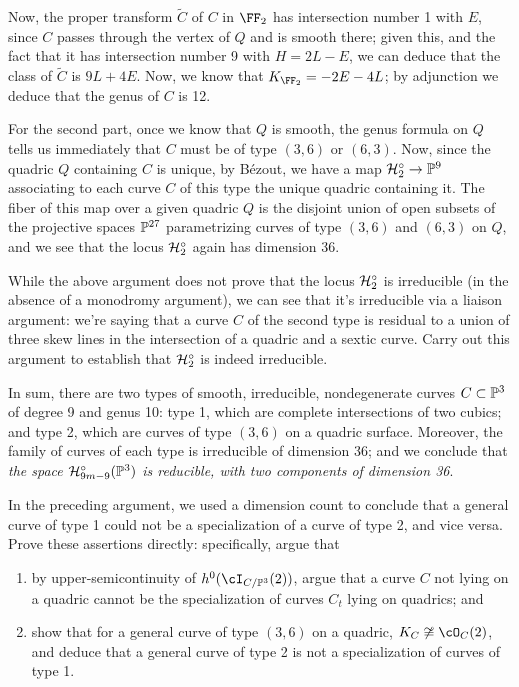 Now, the proper transform $\tilde C$ of $C$ in $\FF_2$ has intersection number 1 with $E$, since $C$ passes through the vertex of $Q$ and is smooth there; given this, and the fact that it has intersection number 9 with $H = 2L-E$, we can deduce that the class of $\tilde C$ is $9L + 4E$. Now, we know that $K_{\FF_2} = -2E - 4L$; by adjunction we deduce that  the genus of $C$ is 12.

For the second part, once we know that $Q$ is smooth, the genus formula on $Q$ tells us immediately that $C$ must be of type $(3,6)$ or $(6,3)$. Now, since the quadric $Q$ containing $C$ is unique, by B\'ezout, we have a map $\cH^\circ_2 \to \PP^9$ associating to each curve $C$ of this type the unique quadric containing it. The fiber of this map over a given quadric $Q$ is the disjoint union of open subsets of the projective spaces $\PP^{27}$ parametrizing curves of type $(3,6)$ and $(6,3)$ on $Q$, and we see that the locus $\cH^\circ_2$ again has dimension 36.

\begin{exercise}
While the above argument does not prove that the locus $\cH^\circ_2$ is irreducible (in the absence of a monodromy argument), we can see that it's irreducible via a liaison argument: we're saying that a curve $C$ of the second type is residual to a union of three skew lines in the intersection of a quadric and a sextic curve. Carry out this argument to establish that $\cH^\circ_2$ is indeed irreducible.
\end{exercise}


In sum, there are two types of smooth, irreducible, nondegenerate curves $C \subset \PP^3$ of degree 9 and genus 10: type 1, which are complete intersections of two cubics; and type 2, which are curves of type $(3,6)$ on a quadric surface. Moreover, the family of curves of each type is irreducible of dimension 36; and we conclude that \emph{the space $\cH^\circ_{9m-9}(\PP^3)$ is reducible, with two components of dimension 36}.


\begin{exercise}
In the preceding argument, we used a dimension count to conclude that a general curve of type 1 could not be a specialization of a curve of type 2, and vice versa. Prove these assertions directly: specifically, argue that
\begin{enumerate}
\item by upper-semicontinuity of $h^0(\cI_{C/\PP^3}(2))$, argue that a curve $C$ not lying on a quadric cannot be the specialization of curves $C_t$ lying on quadrics; and
\item show that for a general curve of type $(3,6)$ on a quadric, $K_C \not\cong \cO_C(2)$, and deduce that a general curve of type 2 is not a specialization of curves of type 1.
\end{enumerate}
\end{exercise}

